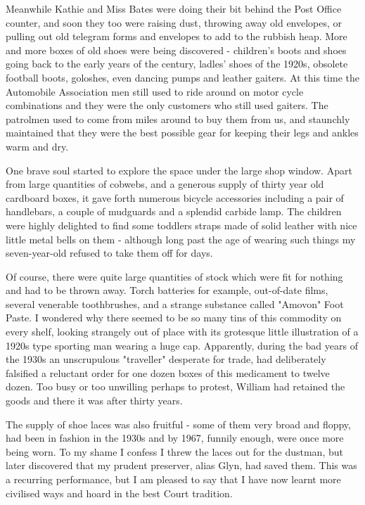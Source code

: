 Meanwhile Kathie and Miss Bates were doing their bit behind the Post Office counter, and soon they too were raising dust, throwing away old envelopes, or pulling out old telegram forms and envelopes to add to the rubbish heap. More and more boxes of old shoes were being discovered - children's boots and shoes going back to the early years of the century, ladles’ shoes of the 1920s, obsolete football boots, goloshes, even dancing pumps and leather gaiters. At this time the Automobile Association men still used to ride around on motor cycle combinations and they were the only customers who still used gaiters. The patrolmen used to come from miles around to buy them from us, and staunchly maintained that they were the best possible gear for keeping their legs and ankles warm and dry.

One brave soul started to explore the space under the large shop window. Apart from large quantities of cobwebs, and a generous supply of thirty year old cardboard boxes, it gave forth numerous bicycle accessories including a pair of handlebars, a couple of mudguards and a splendid carbide lamp. The children were highly delighted to find some toddlers straps made of solid leather with nice little metal bells on them - although long past the age of wearing such things my seven-year-old refused to take them off for days.

Of course, there were quite large quantities of stock which were fit for nothing and had to be thrown away. Torch batteries for example, out-of-date films, several venerable toothbrushes, and a strange substance called "Amovon" Foot Paste. I wondered why there seemed to be so many tins of this commodity on every shelf, looking strangely out of place with its grotesque little illustration of a 1920s type sporting man wearing a huge cap. Apparently, during the bad years of the 1930s an unscrupulous "traveller" desperate for trade, had deliberately falsified a reluctant order for one dozen boxes of this medicament to twelve dozen. Too busy or too unwilling perhaps to protest, William had retained the goods and there it was after thirty years.

The supply of shoe laces was also fruitful - some of them very broad and floppy, had been in fashion in the 1930s and by 1967, funnily enough, were once more being worn. To my shame I confess I threw the laces out for the dustman, but later discovered that my prudent preserver, alias Glyn, had saved them. This was a recurring performance, but I am pleased to say that I have now learnt more civilised ways and hoard in the best Court tradition.

